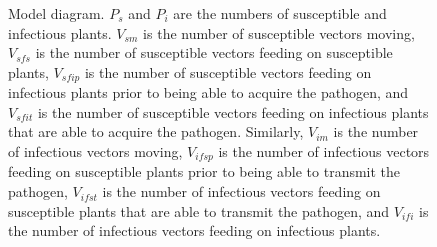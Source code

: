 \documentclass{article}
\begin{document}
\begin{figure}
  \centering
  
  \caption{Model diagram.  $P_s$ and $P_i$ are the numbers
    of susceptible and infectious plants.  $V_{sm}$ is the number of
    susceptible vectors moving, $V_{sfs}$ is the number of susceptible
    vectors feeding on susceptible plants, $V_{sfip}$ is the number of
    susceptible vectors feeding on infectious plants prior to being
    able to acquire the pathogen, and $V_{sfit}$ is the number of
    susceptible vectors feeding on infectious plants that are able to
    acquire the pathogen.  Similarly, $V_{im}$ is the number of
    infectious vectors moving, $V_{ifsp}$ is the number of infectious
    vectors feeding on susceptible plants prior to being able to
    transmit the pathogen, $V_{ifst}$ is the number of infectious
    vectors feeding on susceptible plants that are able to transmit the
    pathogen, and $V_{ifi}$ is the number of infectious vectors
    feeding on infectious plants.}
  \label{fig:full_model_diagram}
\end{figure}
\end{document}
